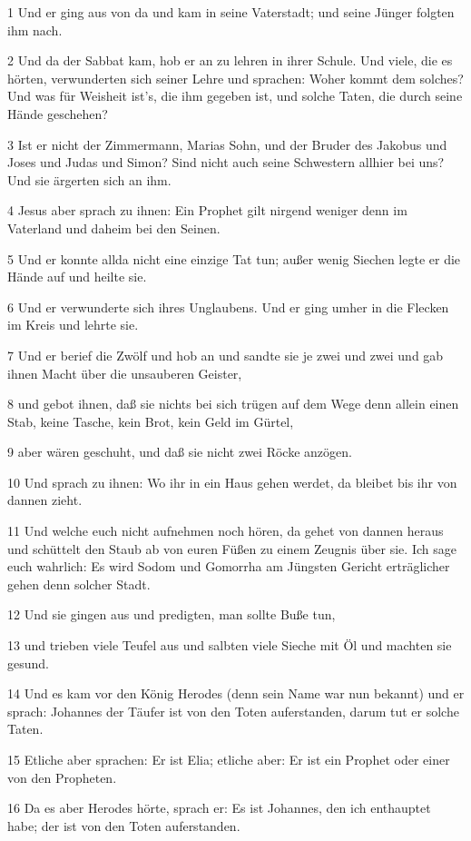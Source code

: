 \par 1 Und er ging aus von da und kam in seine Vaterstadt; und seine Jünger folgten ihm nach.
\par 2 Und da der Sabbat kam, hob er an zu lehren in ihrer Schule. Und viele, die es hörten, verwunderten sich seiner Lehre und sprachen: Woher kommt dem solches? Und was für Weisheit ist's, die ihm gegeben ist, und solche Taten, die durch seine Hände geschehen?
\par 3 Ist er nicht der Zimmermann, Marias Sohn, und der Bruder des Jakobus und Joses und Judas und Simon? Sind nicht auch seine Schwestern allhier bei uns? Und sie ärgerten sich an ihm.
\par 4 Jesus aber sprach zu ihnen: Ein Prophet gilt nirgend weniger denn im Vaterland und daheim bei den Seinen.
\par 5 Und er konnte allda nicht eine einzige Tat tun; außer wenig Siechen legte er die Hände auf und heilte sie.
\par 6 Und er verwunderte sich ihres Unglaubens. Und er ging umher in die Flecken im Kreis und lehrte sie.
\par 7 Und er berief die Zwölf und hob an und sandte sie je zwei und zwei und gab ihnen Macht über die unsauberen Geister,
\par 8 und gebot ihnen, daß sie nichts bei sich trügen auf dem Wege denn allein einen Stab, keine Tasche, kein Brot, kein Geld im Gürtel,
\par 9 aber wären geschuht, und daß sie nicht zwei Röcke anzögen.
\par 10 Und sprach zu ihnen: Wo ihr in ein Haus gehen werdet, da bleibet bis ihr von dannen zieht.
\par 11 Und welche euch nicht aufnehmen noch hören, da gehet von dannen heraus und schüttelt den Staub ab von euren Füßen zu einem Zeugnis über sie. Ich sage euch wahrlich: Es wird Sodom und Gomorrha am Jüngsten Gericht erträglicher gehen denn solcher Stadt.
\par 12 Und sie gingen aus und predigten, man sollte Buße tun,
\par 13 und trieben viele Teufel aus und salbten viele Sieche mit Öl und machten sie gesund.
\par 14 Und es kam vor den König Herodes (denn sein Name war nun bekannt) und er sprach: Johannes der Täufer ist von den Toten auferstanden, darum tut er solche Taten.
\par 15 Etliche aber sprachen: Er ist Elia; etliche aber: Er ist ein Prophet oder einer von den Propheten.
\par 16 Da es aber Herodes hörte, sprach er: Es ist Johannes, den ich enthauptet habe; der ist von den Toten auferstanden.

